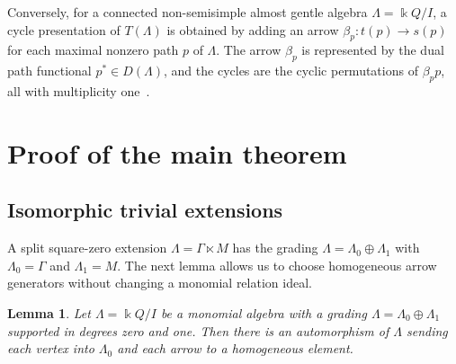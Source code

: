 \documentclass[11pt]{article}
\newtheorem{lemma}[theorem]{Lemma}
\theoremstyle{definition}
\begin{document}
		Conversely, for a connected non-semisimple almost gentle algebra $\Lambda=\Bbbk Q/I$, a cycle presentation of $T(\Lambda)$ is obtained by adding an arrow $\beta_p:t(p)\to s(p)$ for each maximal nonzero path $p$ of $\Lambda$.
		The arrow $\beta_p$ is represented by the dual path functional $p^*\in D(\Lambda)$, and the cycles are the cyclic permutations of $\beta_p p$, all with multiplicity one~\cite[Theorem~4.3]{GreenSchrollAlmost}.

\section{Proof of the main theorem}
\label{sec:trivial-extensions}

	\subsection{Isomorphic trivial extensions}

		A split square-zero extension $\Lambda=\Gamma\ltimes M$ has the grading $\Lambda=\Lambda_0\oplus \Lambda_1$ with $\Lambda_0=\Gamma$ and $\Lambda_1=M$.
		The next lemma allows us to choose homogeneous arrow generators without changing a monomial relation ideal.

		\begin{lemma}
			\label{lem:monomial-grading-presentation}
			Let $\Lambda=\Bbbk Q/I$ be a monomial algebra with a grading $\Lambda=\Lambda_0\oplus \Lambda_1$ supported in degrees zero and one.
			Then there is an automorphism of $\Lambda$ sending each vertex into $\Lambda_0$ and each arrow to a homogeneous element.
		\end{lemma}
\end{document}
